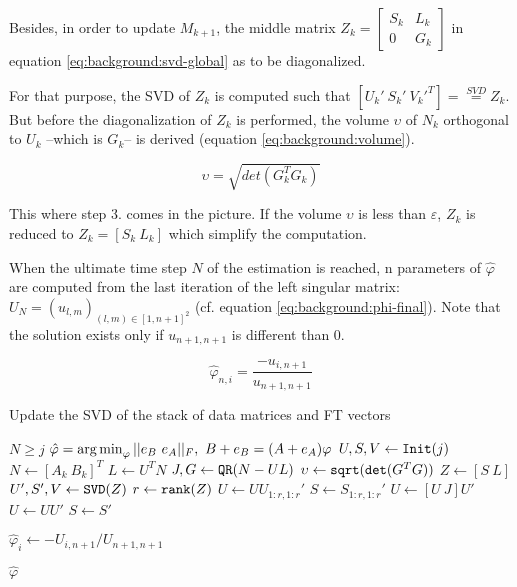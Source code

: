 \documentclass[/home/francois/latex/report/main.tex]{subfiles}
\begin{document}
Besides, in order to update $M_{k+1}$, the middle matrix $Z_k=
\begin{bmatrix}
  S_k &  L_k \\
  0 & G_k
\end{bmatrix}$
in equation \ref{eq:background:svd-global} as to be diagonalized.

For that purpose, the \ac{SVD} of $Z_k$ is computed such that $[U_{k}' \ S_{k}' \ V_{k}'^T] = \overset{SVD}{=} Z_k$. But before the diagonalization of $Z_k$ is performed, the volume $\upsilon$ of $N_k$ orthogonal to $U_k$ –which is $G_k$– is derived (equation \ref{eq:background:volume}).

\begin{equation}
  \label{eq:background:volume}
  \upsilon = \sqrt{det(G_k^T G_k)}
\end{equation}

This where step 3. comes in the picture. If the volume $\upsilon$ is less than $\varepsilon$, $Z_k$ is reduced to $Z_k = [S_k \ L_k]$ which simplify the computation.

When the ultimate time step $N$ of the estimation is reached, n parameters of $\hat{\varphi}$ are computed from the last iteration of the left singular matrix: $U_{N} = (u_{l,m})_{(l, m) \in [1,n+1]^2}$ (cf. equation \ref{eq:background:phi-final}). Note that the solution exists only if $u_{n+1, n+1}$ is different than 0.

\begin{equation}
  \label{eq:background:phi-final}
  \hat{\varphi}_{n, i} = \frac{-u_{i, n+1}}{u_{n+1, n+1}}
\end{equation}

\begin{algorithm}
\caption{Update the \ac{SVD} of the stack of data matrices and \ac{FT} vectors \label{alg:background:adaptation}}
\begin{algorithmic}
\REQUIRE $N \geq j$
\ENSURE $\hat{\varphi} = \argmin_{\varphi} ||e_B \ e_A||_F, \ B + e_B = (A + e_A) \varphi$
\STATE $U, S, V \leftarrow \text{\texttt{Init}}(j)$
\STATE $N \leftarrow [A_k \ B_k]^T$
\STATE $L \leftarrow U^T N$
\STATE $J, G \leftarrow \text{\texttt{QR}}(N - UL)$
\STATE $\upsilon \leftarrow \text{\texttt{sqrt}}(\text{\texttt{det}}(G^TG))$
\IF{$\upsilon \leq \varepsilon$}
\STATE $Z \leftarrow [S \ L]$
\STATE $U', S', V \leftarrow \text{\texttt{SVD}}(Z)$
\STATE $r \leftarrow \text{\texttt{rank}}(Z)$
\STATE $U \leftarrow U U_{1:r, 1:r}'$
\STATE $S \leftarrow S_{1:r, 1:r}'$
\ELSE
\STATE $U \leftarrow [U \ J] U'$
\STATE $U \leftarrow U U'$
\STATE $S \leftarrow S'$
\ENDIF
\ENDFOR

\STATE $\hat{\varphi}_i \leftarrow -U_{i, n+1} / U_{n+1, n+1}$
\ENDFOR

\RETURN $\hat{\varphi}$
\end{algorithmic}
\end{algorithm}
\end{document}

